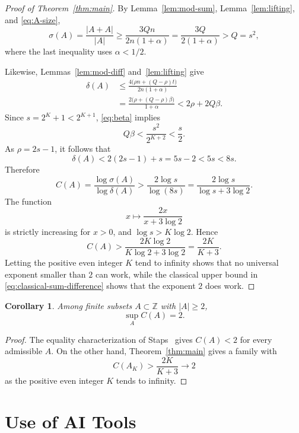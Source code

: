 \documentclass[11pt,reqno]{amsart}
\theoremstyle{plain}
\newtheorem{corollary}{Corollary}[section]
\theoremstyle{definition}
\theoremstyle{remark}
\theoremstyle{named}
\newcommand{\Z}{\mathbb Z}
\newcommand{\card}[1]{\lvert #1\rvert}
\begin{document}
\begin{proof}[Proof of Theorem~\ref{thm:main}]
By Lemma~\ref{lem:mod-sum}, Lemma~\ref{lem:lifting}, and
\eqref{eq:A-size},
\[
 \sigma(A)
 =\frac{\card{A+A}}{\card A}
 \ge\frac{3Qn}{2n(1+\alpha)}
 =\frac{3Q}{2(1+\alpha)}
 >Q=s^2,
\]
where the last inequality uses $\alpha<1/2$.

Likewise, Lemmas~\ref{lem:mod-diff} and~\ref{lem:lifting} give
\begin{align*}
 \delta(A)
 &\le
 \frac{4\bigl(\rho n+(Q-\rho)t\bigr)}{2n(1+\alpha)}\\
 &=\frac{2\bigl(\rho+(Q-\rho)\beta\bigr)}{1+\alpha}
 <2\rho+2Q\beta.
\end{align*}
Since $s=2^K+1<2^{K+1}$, \eqref{eq:beta} implies
\[
 Q\beta
 <\frac{s^2}{2^{K+2}}
 <\frac{s}{2}.
\]
As $\rho=2s-1$, it follows that
\[
 \delta(A)<2(2s-1)+s=5s-2<5s<8s.
\]
Therefore
\[
 C(A)
 =\frac{\log\sigma(A)}{\log\delta(A)}
 >\frac{2\log s}{\log(8s)}
 =\frac{2\log s}{\log s+3\log2}.
\]
The function
\[
 x\longmapsto\frac{2x}{x+3\log2}
\]
is strictly increasing for $x>0$, and $\log s>K\log2$.  Hence
\[
 C(A)>\frac{2K\log2}{K\log2+3\log2}
 =\frac{2K}{K+3}.
\]
Letting the positive even integer $K$ tend to infinity shows that no universal
exponent smaller than $2$ can work, while the classical upper bound in
\eqref{eq:classical-sum-difference} shows that the exponent $2$ does work.
\end{proof}


\begin{corollary}\label{cor:supremum}
Among finite subsets $A\subset\Z$ with $\card A\ge2$,
\[
 \sup_A C(A)=2.
\]
\end{corollary}

\begin{proof}
The equality characterization of Staps~\cite{Staps2015} gives $C(A)<2$ for
every admissible $A$.  On the other hand, Theorem~\ref{thm:main} gives a family
with
\[
 C(A_K)>\frac{2K}{K+3}\longrightarrow2
\]
as the positive even integer $K$ tends to infinity.
\end{proof}

\section{Use of AI Tools}\label{sec:ai-tools}
\end{document}
